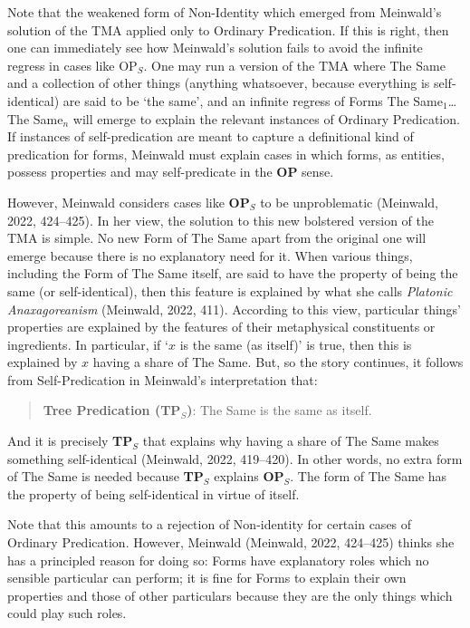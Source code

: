 \noindent Note that the weakened form of Non-Identity which emerged from Meinwald's solution of the TMA applied only to Ordinary Predication. If this is right, then one can immediately see how Meinwald's solution fails to avoid the infinite regress in cases like OP$_S$. One may run a version of the TMA where The Same and a collection of other things (anything whatsoever, because everything is self-identical) are said to be `the same', and an infinite regress of Forms The Same$_1$\dots The Same$_n$ will emerge to explain the relevant instances of Ordinary Predication. If instances of self-predication are meant to capture a definitional kind of predication for forms, Meinwald must explain cases in which forms, as entities, possess properties and may self-predicate in the \textbf{OP} sense.

However, Meinwald considers cases like \textbf{OP$_S$} to be unproblematic (Meinwald, 2022, 424--425). In her view, the solution to this new bolstered version of the TMA is simple. No new Form of The Same apart from the original one will emerge because there is no explanatory need for it. When various things, including the Form of The Same itself, are said to have the property of being the same (or self-identical), then this feature is explained by what she calls \textit{Platonic Anaxagoreanism} (Meinwald, 2022, 411). According to this view, particular things' properties are explained by the features of their metaphysical constituents or ingredients. In particular, if `$x$ is the same (as itself)' is true, then this is explained by $x$ having a share of The Same. But, so the story continues, it follows from Self-Predication in Meinwald's interpretation that:
\begin{quote}
\textbf{Tree Predication (TP$_S$)}: The Same is the same as itself.
\end{quote}

\noindent And it is precisely \textbf{TP$_S$} that explains why having a share of The Same makes something self-identical (Meinwald, 2022, 419--420). In other words, no extra form of The Same is needed because \textbf{TP$_S$} explains \textbf{OP$_S$}. The form of The Same has the property of being self-identical in virtue of itself. 

Note that this amounts to a rejection of Non-identity for certain cases of Ordinary Predication. However, Meinwald (Meinwald, 2022, 424--425) thinks she has a principled reason for doing so: Forms have explanatory roles which no sensible particular can perform; it is fine for Forms to explain their own properties and those of other particulars because they are the only things which could play such roles.


